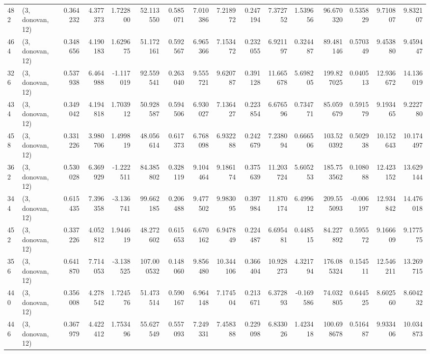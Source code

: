 \begin{tabular}{llrrrrrrrrrrrrrr}
482 &  (3, donovan, 12) &   0.364232 &   4.377373 &   1.722800 &    52.113550 &   0.585071 &   7.010386 &   7.218972 &  0.247194 &   7.372752 &   1.539656 &    96.670320 &   0.535829 &   9.710807 &   9.832107 \\
464 &  (3, donovan, 12) &   0.348656 &   4.190183 &   1.629675 &    51.172161 &   0.592567 &   6.965366 &   7.153472 &  0.232055 &   6.921197 &   0.324487 &    89.481146 &   0.570349 &   9.453880 &   9.459447 \\
326 &  (3, donovan, 12) &   0.537938 &   6.464988 &  -1.117019 &    92.559541 &   0.263040 &   9.555721 &   9.620787 &  0.391128 &  11.665678 &   5.698205 &   199.827025 &   0.040513 &  12.936672 &  14.136019 \\
434 &  (3, donovan, 12) &   0.349042 &   4.194818 &   1.703912 &    50.928587 &   0.594506 &   6.930027 &   7.136427 &  0.223854 &   6.676596 &   0.734771 &    85.059679 &   0.591579 &   9.193465 &   9.222780 \\
458 &  (3, donovan, 12) &   0.331226 &   3.980706 &   1.499819 &    48.056614 &   0.617373 &   6.768098 &   6.932288 &  0.242679 &   7.238094 &   0.666506 &   103.520392 &   0.502938 &  10.152643 &  10.174497 \\
362 &  (3, donovan, 12) &   0.530028 &   6.369929 &  -1.222511 &    84.385802 &   0.328119 &   9.104464 &   9.186174 &  0.375639 &  11.203724 &   5.605253 &   185.753562 &   0.108088 &  12.423152 &  13.629144 \\
344 &  (3, donovan, 12) &   0.615435 &   7.396358 &  -3.136741 &    99.662185 &   0.206488 &   9.477502 &   9.983095 &  0.397984 &  11.870174 &   6.499612 &   209.555093 &  -0.006197 &  12.934842 &  14.476018 \\
452 &  (3, donovan, 12) &   0.337226 &   4.052812 &   1.944619 &    48.272602 &   0.615653 &   6.670162 &   6.947849 &  0.224487 &   6.695481 &   0.448515 &    84.227892 &   0.595572 &   9.166609 &   9.177575 \\
356 &  (3, donovan, 12) &   0.641870 &   7.714053 &  -3.138525 &   107.000532 &   0.148060 &   9.856480 &  10.344106 &  0.366404 &  10.928273 &   4.321794 &   176.085324 &   0.154511 &  12.546211 &  13.269715 \\
440 &  (3, donovan, 12) &   0.356008 &   4.278542 &   1.724576 &    51.473514 &   0.590167 &   6.964148 &   7.174504 &  0.213671 &   6.372893 &  -0.169586 &    74.032805 &   0.644525 &   8.602560 &   8.604232 \\
446 &  (3, donovan, 12) &   0.367979 &   4.422412 &   1.753496 &    55.627549 &   0.557093 &   7.249331 &   7.458388 &  0.229098 &   6.833026 &   1.423418 &   100.698678 &   0.516487 &   9.933406 &  10.034873 \\

\end{tabular}

